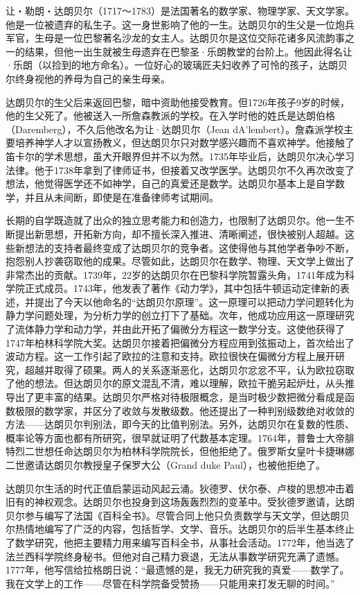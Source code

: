 \documentclass[b5paper]{ctexart}
\begin{document}
\begin{mdframed}
让・勒朗・达朗贝尔（1717～1783）是法国著名的数学家、物理学家、天文学家。他是一位被遗弃的私生子。这一身世影响了他的一生。达朗贝尔的生父是一位炮兵军官，生母是一位巴黎著名沙龙\footnotemark 的女主人。达朗贝尔是这位交际花诸多风流韵事之一的结果，但他一出生就被生母遗弃在巴黎圣·乐朗教堂的台阶上。他因此得名让·乐朗（以捡到的地方命名）。一位好心的玻璃匠夫妇收养了可怜的孩子，达朗贝尔终身视他的养母为自己的亲生母亲。

达朗贝尔的生父后来返回巴黎，暗中资助他接受教育。但1726年孩子9岁的时候，他的生父死了。他被送入一所詹森教派的学校。在入学时他的姓氏是达朗伯格（Daremberg），不久后他改名为让·达朗贝尔（Jean dA'lembert）。詹森派学校主要培养神学人才以宣扬教义，但达朗贝尔只对数学感兴趣而不喜欢神学。他接触了笛卡尔的学术思想，虽大开眼界但并不以为然。1735年毕业后，达朗贝尔决心学习法律。他于1738年拿到了律师证书，但接着又改学医学。达朗贝尔不久再次改变了想法，他觉得医学还不如神学，自己的真爱还是数学。达朗贝尔基本上是自学数学，并且从未间断，即使是在准备律师考试期间。

长期的自学既造就了出众的独立思考能力和创造力，也限制了达朗贝尔。他一生不断提出新思想，开拓新方向，却不擅长深入推进、清晰阐述，很快被别人超越。这些新想法的支持者最终变成了达朗贝尔的竞争者。这使得他与其他学者争吵不断，抱怨别人抄袭窃取他的成果。尽管如此，达朗贝尔在数学、物理、天文学上做出了非常杰出的贡献。1739年，22岁的达朗贝尔在巴黎科学院暂露头角，1741年成为科学院正式成员。1743年，他发表了著作《动力学》，其中包括牛顿运动定律新的表述，并提出了今天以他命名的“达朗贝尔原理”。这一原理可以把动力学问题转化为静力学问题处理，为分析力学的创立打下了基础。次年，他成功应用这一原理研究了流体静力学和动力学，并由此开拓了偏微分方程这一数学分支。这使他获得了1747年柏林科学院大奖。达朗贝尔接着把偏微分方程应用到弦振动上，首次给出了波动方程。这一工作引起了欧拉的注意和支持。欧拉很快在偏微分方程上展开研究，超越并取得了硕果。两人的关系逐渐恶化，达朗贝尔忿忿不平，认为欧拉窃取了他的想法。但达朗贝尔的原文混乱不清，难以理解，欧拉干脆另起炉灶，从头推导出了更丰富的结果。达朗贝尔严格对待极限概念，是当时极少数把微分看成是函数极限的数学家，并区分了收敛与发散级数。他还提出了一种判别级数绝对收敛的方法——达朗贝尔判别法，即今天的比值判别法。另外，达朗贝尔在复数的性质、概率论等方面也都有所研究，很早就证明了代数基本定理。1764年，普鲁士大帝腓特烈二世想任命达朗贝尔为柏林科学院院长，但他拒绝了。俄罗斯女皇叶卡捷琳娜二世邀请达朗贝尔教授皇子保罗大公（Grand duke Paul），也被他拒绝了。

达朗贝尔生活的时代正值启蒙运动风起云涌。狄德罗、伏尔泰、卢梭的思想冲击着旧有的神权观念。达朗贝尔也投身到这场轰轰烈烈的变革中。受狄德罗邀请，达朗贝尔参与编写了法国《百科全书》。尽管合同上他只负责数学与天文学，但达朗贝尔热情地编写了广泛的内容，包括哲学、文学、音乐。达朗贝尔的后半生基本终止了数学研究，他把主要精力用来编写百科全书，从事社会活动。1772年，他当选了法兰西科学院终身秘书。但他对自己精力衰退，无法从事数学研究充满了遗憾。1777年，他写信给拉格朗日说\cite{MacTour-dAlembert}：“最遗憾的是，我无力研究我的真爱——数学了。我在文学上的工作——尽管在科学院备受赞扬——只能用来打发无聊的时间。”


\end{mdframed}
\end{document}
